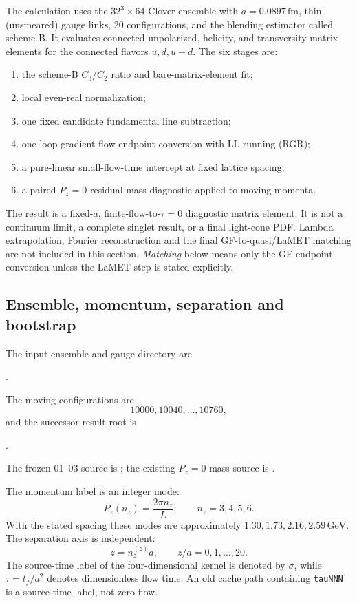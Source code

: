 \documentclass[11pt]{article}
\numberwithin{equation}{section}
\begin{document}
The calculation uses the \(32^3\times64\) Clover ensemble with
\(a=0.0897\,\mathrm{fm}\), thin (unsmeared) gauge links, 20 configurations,
and the blending estimator called scheme B.  It evaluates connected
unpolarized, helicity, and transversity matrix elements for the connected
flavors \(u,d,u-d\).  The six stages are:
\begin{enumerate}
  \item the scheme-B \(C_3/C_2\) ratio and bare-matrix-element fit;
  \item local even-real normalization;
  \item one fixed candidate fundamental line subtraction;
  \item one-loop gradient-flow endpoint conversion with LL running (RGR);
  \item a pure-linear small-flow-time intercept at fixed lattice spacing;
  \item a paired \(P_z=0\) residual-mass diagnostic applied to moving momenta.
\end{enumerate}
The result is a fixed-\(a\), finite-flow-to-\(\tau=0\) diagnostic matrix
element.  It is not a continuum limit, a complete singlet result, or a
final light-cone PDF.  Lambda extrapolation, Fourier reconstruction and
the final GF-to-quasi/LaMET matching are not included in this section.
\textit{Matching} below means only the GF endpoint conversion unless the
LaMET step is stated explicitly.

\subsection{Ensemble, momentum, separation and bootstrap}

The input ensemble and gauge directory are
\begin{center}
.
\end{center}
The moving configurations are
\[
  10000,10040,\ldots,10760,
\]
and the successor result root is
\begin{center}
.
\end{center}
The frozen 01--03 source is
; the existing \(P_z=0\)
mass source is
.

The momentum label is an integer mode:
\begin{equation}
 P_z(n_z)=\frac{2\pi n_z}{L},\qquad n_z=3,4,5,6.
\label{eq:l32x64-moving-momentum}
\end{equation}
With the stated spacing these modes are approximately
\(1.30,1.73,2.16,2.59\,\mathrm{GeV}\).  The separation axis is independent:
\[
 z=n_z^{(z)}a,\qquad z/a=0,1,\ldots,20.
\]
The source-time label of the four-dimensional kernel is denoted by
\(\sigma\), while \(\tau=t_f/a^2\) denotes dimensionless flow time.  An
old cache path containing \texttt{tauNNN} is a source-time label, not
zero flow.
\end{document}
